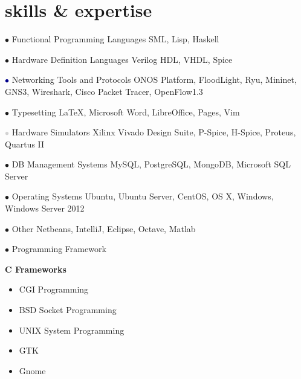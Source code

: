 \documentclass[]{friggeri-cv} %
\begin{document}
\section{skills \& expertise}

\begin{entrylist}

	\entry
	{\textcolor{TextGreen}{$\bullet$}}
	{Functional Programming Languages}
	{}
	{SML, Lisp, Haskell}


	\entry
	{\textcolor{TextOrange}{$\bullet$}}
	{Hardware Definition Languages}
	{}
	{Verilog HDL, VHDL, Spice}


	\entry
	{\textcolor{DarkBlue}{$\bullet$}}
	{Networking Tools and Protocols}
	{}
	{ONOS Platform, FloodLight, Ryu, Mininet, GNS3, Wireshark, Cisco Packet Tracer, OpenFlow1.3}


	\entry
	{\textcolor{Ocean}{$\bullet$}}
	{Typesetting}
	{}
	{\LaTeX, Microsoft Word, LibreOffice, Pages, Vim}


	\entry
	{\textcolor{LightGray}{$\bullet$}}
	{Hardware Simulators}
	{}
	{Xilinx Vivado Design Suite, P-Spice, H-Spice, Proteus, Quartus II}


	\entry
	{\textcolor{TextYellow}{$\bullet$}}
	{DB Management Systems}
	{}
	{MySQL, PostgreSQL, MongoDB, Microsoft SQL Server}


	\entry
	{\textcolor{TextRed}{$\bullet$}}
	{Operating Systems}
	{}
	{Ubuntu, Ubuntu Server, CentOS, OS X, Windows, Windows Server 2012}


	\entry
	{\textcolor{TextPink}{$\bullet$}}
	{Other}
	{}
	{Netbeans, IntelliJ, Eclipse, Octave, Matlab}


	\entry
	{\textcolor{UniBlue}{$\bullet$}}
	{Programming Framework}
	{}
	{
		\textbf{C Frameworks}
		\begin{itemize}
			\item CGI Programming
			\item BSD Socket Programming
			\item UNIX System Programming
			\item GTK
			\item Gnome
		\end{itemize}
	
}
\end{entrylist}
\end{document}
